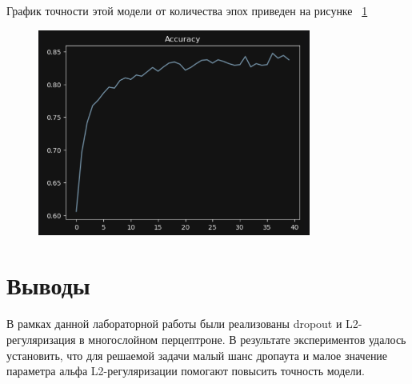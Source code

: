\documentclass[a4paper, 14pt]{extarticle}
\begin{document}
График точности этой модели от количества эпох приведен на рисунке ~\ref{fig:img7}

\begin{figure}[H]
\centering
\includegraphics[width=0.8\textwidth]{images/res7.png}
\caption{}
\label{fig:img7}
\end{figure}

\section{Выводы}
В рамках данной лабораторной работы были реализованы dropout и L2-регуляризация в многослойном перцептроне. В результате экспериментов удалось установить, что для решаемой задачи малый шанс дропаута и малое значение параметра альфа L2-регуляризации помогают повысить точность модели.
\end{document}
